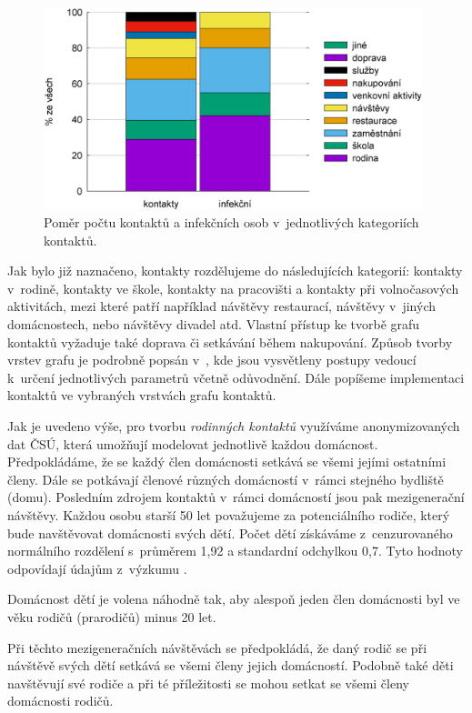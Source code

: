 \begin{figure}
    \centering
    \includegraphics[width=11cm]{pic/filled_cz.eps}
    \caption{Poměr počtu kontaktů a infekčních osob v~jednotlivých kategoriích kontaktů.}
    \label{kategorie}
\end{figure}

Jak bylo již naznačeno, kontakty rozdělujeme do následujících kategorií: kontakty v~rodině, kontakty ve škole, kontakty na pracovišti a kontakty při volnočasových aktivitách, mezi které patří například návštěvy restaurací, návštěvy v~jiných do\-mác\-nos\-tech, nebo návštěvy divadel atd. Vlastní přístup ke tvorbě grafu kontaktů vy\-ža\-du\-je také doprava či setkávání během nakupování. Způsob tvorby vrstev grafu je podrobně popsán v~\cite{M-techrep2021}, kde jsou vysvětleny postupy vedoucí k~určení jednotlivých parametrů včetně odůvodnění. Dále popíšeme implementaci kontaktů ve vybraných vrstvách grafu kontaktů.

Jak je uvedeno výše, pro tvorbu \emph{rodinných kontaktů} využíváme anonymizovaných dat ČSÚ, která umožňují modelovat jednotlivě každou domácnost. Předpokládáme, že se každý člen domácnosti setkává se všemi jejími ostatními členy. Dále se potkávají členové různých domácností v~rámci stejného bydliště (domu). Posledním zdrojem kontaktů v~rámci domácností jsou pak mezigenerační návštěvy.
Každou osobu starší 50 let považujeme za potenciálního rodiče, který bude navštěvovat domácnosti svých dětí. Počet dětí získáváme z~cenzurovaného normálního rozdělení s~průměrem 1,92 a standardní odchylkou 0,7. Tyto hodnoty odpovídají údajům z~výzkumu \cite{zaj:ess}.

Domácnost dětí je volena náhodně tak, aby alespoň jeden člen domácnosti byl ve věku rodičů (prarodičů) minus 20 let.

Při těchto mezigeneračních návštěvách se předpokládá, že daný rodič se při návštěvě svých dětí setkává se všemi členy jejich domácností. Podobně také děti navštěvují své rodiče a při té příležitosti se mohou setkat se všemi členy domácnosti rodičů.

